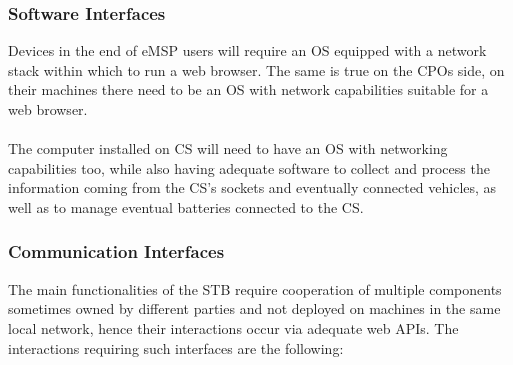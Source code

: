 \documentclass[11pt]{article}
\begin{document}
\subsubsection{Software Interfaces}

Devices in the end of eMSP users will require an OS equipped with a network stack within which to run a web browser. The same is true on the CPOs side, on their machines there need to be an OS with network capabilities suitable for a web browser. \\
\\
The computer installed on CS will need to have an OS with networking capabilities too, while also having adequate software to collect and process the information coming from the CS's sockets and eventually connected vehicles, as well as to manage eventual batteries connected to the CS.


\subsubsection{Communication Interfaces}


The main functionalities of the STB require cooperation of multiple components sometimes owned by different parties and not deployed on machines in the same local network, hence their interactions occur via adequate web APIs. The interactions requiring such interfaces are the following:
\end{document}
